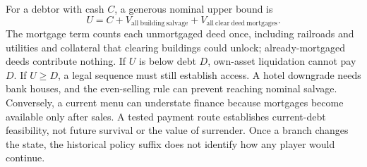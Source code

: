 For a debtor with cash $C$, a generous nominal upper bound is
\begin{equation}
 U=C+V_{\mathrm{all\ building\ salvage}}
       +V_{\mathrm{all\ clear\ deed\ mortgages}}.
 \label{eq:sol-upper}
\end{equation}
The mortgage term counts each unmortgaged deed once, including railroads and utilities and collateral that clearing buildings could unlock; already-mortgaged deeds contribute nothing. If $U$ is below debt $D$, own-asset liquidation cannot pay $D$. If $U\geq D$, a legal sequence must still establish access. A hotel downgrade needs bank houses, and the even-selling rule can prevent reaching nominal salvage. Conversely, a current menu can understate finance because mortgages become available only after sales. A tested payment route establishes current-debt feasibility, not future survival or the value of surrender. Once a branch changes the state, the historical policy suffix does not identify how any player would continue.

